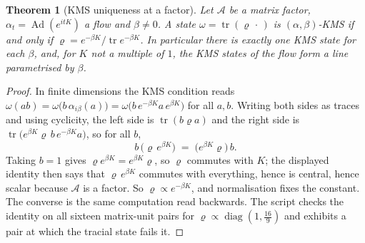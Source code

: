 \documentclass[11pt]{article}
\newtheorem{theorem}{Theorem}[section]
\theoremstyle{definition}
\theoremstyle{plain}
\providecommand{\Aa}{}\renewcommand{\Aa}{\mathcal{A}}
\providecommand{\tr}{}\renewcommand{\tr}{\operatorname{tr}}
\begin{document}
\begin{theorem}[KMS uniqueness at a factor]\label{c:singularity.kms-uniqueness-factor}
Let $\Aa$ be a matrix factor, $\alpha_t = \operatorname{Ad}(e^{itK})$ a flow and $\beta \neq 0$. A state $\omega = \tr(\varrho\,\cdot\,)$ is $(\alpha,\beta)$-KMS if and only if $\varrho = e^{-\beta K}/\tr e^{-\beta K}$. In particular there is exactly one KMS state for each $\beta$, and, for $K$ not a multiple of $1$, the KMS states of the flow form a line parametrised by $\beta$.
\end{theorem}
\begin{proof}
In finite dimensions the KMS condition reads $\omega(ab) = \omega\bigl(b\,\alpha_{i\beta}(a)\bigr) = \omega\bigl(b\,e^{-\beta K}a\,e^{\beta K}\bigr)$ for all $a, b$. Writing both sides as traces and using cyclicity, the left side is $\tr(b\varrho a)$ and the right side is $\tr\bigl(e^{\beta K}\varrho\, b\, e^{-\beta K} a\bigr)$, so for all $b$,
\[
b\,\bigl(\varrho\, e^{\beta K}\bigr) \;=\; \bigl(e^{\beta K}\varrho\bigr)\, b .
\]
Taking $b = 1$ gives $\varrho e^{\beta K} = e^{\beta K}\varrho$, so $\varrho$ commutes with $K$; the displayed identity then says that $\varrho\,e^{\beta K}$ commutes with everything, hence is central, hence scalar because $\Aa$ is a factor. So $\varrho \propto e^{-\beta K}$, and normalisation fixes the constant. The converse is the same computation read backwards. The script checks the identity on all sixteen matrix-unit pairs for $\varrho \propto \operatorname{diag}(1, \tfrac{16}{9})$ and exhibits a pair at which the tracial state fails it.

\end{proof}
\end{document}
